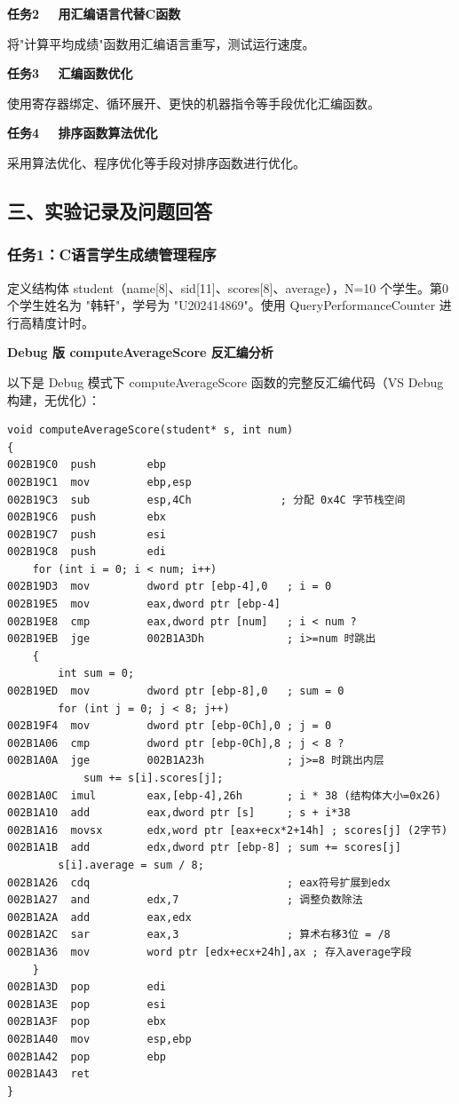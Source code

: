 \documentclass[12pt,a4paper]{ctexart}
\newcommand{\studentname}{韩轩}
\newcommand{\studentid}{U202414869}
\begin{document}
\textbf{任务2 \ \ 用汇编语言代替C函数}

将"计算平均成绩"函数用汇编语言重写，测试运行速度。

\textbf{任务3 \ \ 汇编函数优化}

使用寄存器绑定、循环展开、更快的机器指令等手段优化汇编函数。

\textbf{任务4 \ \ 排序函数算法优化}

采用算法优化、程序优化等手段对排序函数进行优化。

\subsection*{三、实验记录及问题回答}

\subsubsection*{任务1：C语言学生成绩管理程序}

定义结构体 student（name[8]、sid[11]、scores[8]、average），N=10 个学生。第0个学生姓名为 "\studentname"，学号为 "\studentid"。使用 QueryPerformanceCounter 进行高精度计时。

\textbf{Debug 版 computeAverageScore 反汇编分析}

以下是 Debug 模式下 computeAverageScore 函数的完整反汇编代码（VS Debug 构建，无优化）：

\begin{lstlisting}
void computeAverageScore(student* s, int num)
{
002B19C0  push        ebp
002B19C1  mov         ebp,esp
002B19C3  sub         esp,4Ch              ; 分配 0x4C 字节栈空间
002B19C6  push        ebx
002B19C7  push        esi
002B19C8  push        edi
    for (int i = 0; i < num; i++)
002B19D3  mov         dword ptr [ebp-4],0   ; i = 0
002B19E5  mov         eax,dword ptr [ebp-4]
002B19E8  cmp         eax,dword ptr [num]   ; i < num ?
002B19EB  jge         002B1A3Dh             ; i>=num 时跳出
    {
        int sum = 0;
002B19ED  mov         dword ptr [ebp-8],0   ; sum = 0
        for (int j = 0; j < 8; j++)
002B19F4  mov         dword ptr [ebp-0Ch],0 ; j = 0
002B1A06  cmp         dword ptr [ebp-0Ch],8 ; j < 8 ?
002B1A0A  jge         002B1A23h             ; j>=8 时跳出内层
            sum += s[i].scores[j];
002B1A0C  imul        eax,[ebp-4],26h       ; i * 38 (结构体大小=0x26)
002B1A10  add         eax,dword ptr [s]     ; s + i*38
002B1A16  movsx       edx,word ptr [eax+ecx*2+14h] ; scores[j] (2字节)
002B1A1B  add         edx,dword ptr [ebp-8] ; sum += scores[j]
        s[i].average = sum / 8;
002B1A26  cdq                               ; eax符号扩展到edx
002B1A27  and         edx,7                 ; 调整负数除法
002B1A2A  add         eax,edx
002B1A2C  sar         eax,3                 ; 算术右移3位 = /8
002B1A36  mov         word ptr [edx+ecx+24h],ax ; 存入average字段
    }
002B1A3D  pop         edi
002B1A3E  pop         esi
002B1A3F  pop         ebx
002B1A40  mov         esp,ebp
002B1A42  pop         ebp
002B1A43  ret
}
\end{lstlisting}
\end{document}
